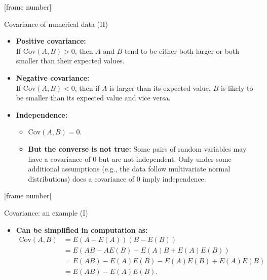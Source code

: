 \documentclass[aspectratio=169,t]{beamer}
\begin{document}
  {
    [frame number]
    \begin{frame}{Covariance of numerical data (II)}
    \begin{itemize}
      \item \textbf{Positive covariance:}\\
            If $\text{Cov}(A,B) > 0$, then $A$ and $B$ tend to be either both larger or both smaller than their expected values.
      \item \textbf{Negative covariance:}\\
            If $\text{Cov}(A,B) < 0$, then if $A$ is larger than its expected value, $B$ is likely to be smaller than its expected value and vice versa.
      \item \textbf{Independence:}
      \begin{itemize}
        \item $\text{Cov}(A,B) = 0$.
        \item \textbf{\color{airforceblue}But the converse is not true:} Some pairs of random variables may have a covariance of $0$ but are not independent. Only under some additional assumptions (e.g., the data follow multivariate normal distributions) does a covariance of $0$ imply independence.
      \end{itemize}
    \end{itemize}
    \end{frame}
  }

  {
    [frame number]
    \begin{frame}{Covariance: an example (I)}
    \begin{itemize}
      \item \textbf{Can be simplified in computation as:}
            \begin{align}
              \text{Cov}(A,B) &= E(A - E(A))(B-E(B))\\
                              &= E(AB-AE(B)-E(A)B+E(A)E(B))\\
                              &= E(AB)-E(A)E(B)-E(A)E(B)+E(A)E(B)\\
                              &= E(AB)-E(A)E(B).
            \end{align}
    \end{itemize}
    \end{frame}
  }
\end{document}
